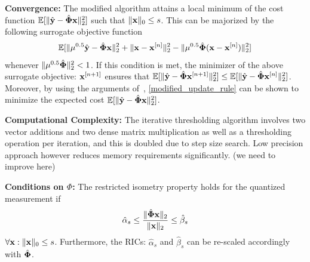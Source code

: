 \documentclass{article}
\begin{document}
{\bf Convergence:} The modified algorithm attains a local minimum of the cost function $\mathbb{E} [ \| \hat{\bf y} - \hat{\bf \Phi}{\bf x}\|_2^2]$ such that $\|{\bf x}\|_0 \leq s$. This can be majorized by the following surrogate objective function 
\begin{equation*}
    \begin{split}
        \mathbb{E} [\|\mu^{0.5}\hat{\bf y} -   \hat{\bf \Phi}{\bf x}\|_2^2+ \|{\bf x} 
    - {\bf x}^{[n]} \|_2^2
    - \|\mu^{0.5}\hat{\bf \Phi}({\bf x}- {\bf x}^{[n]}) \|_2^2] 
    \end{split}
\end{equation*}
whenever $\| \mu^{0.5}\hat{\bf \Phi}\|_2^2 <1$. If this condition is met, the minimizer of the above surrogate objective: ${\bf x}^{[n+1]}$ ensures that $\mathbb{E} [\| \hat{\bf y} - \hat{\bf \Phi}{\bf x}^{[n+1]}\|_2^2] \leq \mathbb{E}[ \| \hat{\bf y} - \hat{\bf \Phi}{\bf x}^{[n]}\|_2^2]$. Moreover, by using the arguments of~\cite{blumensath2008iht}, \ref{modified_update_rule} can be shown to minimize the expected cost $\mathbb{E} [ \| \hat{\bf y} - \hat{\bf \Phi}{\bf x}\|_2^2]$.

{\bf Computational Complexity:} The iterative thresholding algorithm involves two vector additions and two dense matrix multiplication as well as a thresholding operation per iteration, and this is doubled due to step size search. Low precision approach however reduces memory requirements significantly. (we need to improve here)
 
{\bf Conditions on ${\Phi}$:} The restricted isometry property holds for the quantized measurement if
\begin{equation}
    \hat{\alpha}_{s} \leq \frac{\|\hat{{\bf \Phi}} {\bf x}\|_2}{\|{\bf x}\|_2} \leq \hat{\beta}_{s}
\end{equation}
$\forall {\bf x}: \| {\bf x}\|_0 \leq s$. Furthermore, the RICs: $\hat{\alpha}_s$ and $\hat{\beta}_s$ can be re-scaled accordingly with $\hat{\bf \Phi}$.

\end{document}
